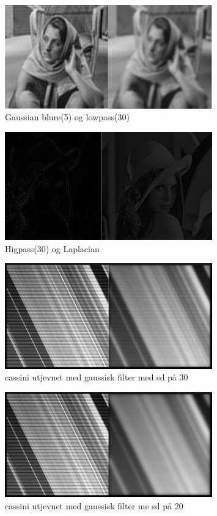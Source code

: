 \documentclass[a4paper, 12pt]{article}
\begin{document}
\begin{figure}[h]
  \centering
  \includegraphics[width=0.8\textwidth]{images/barbara-gaussian-lowpass.png}
  \caption{Gaussian blure(5) og lowpass(30)}
  \label{fig:bgl}
\end{figure}


\begin{figure}[h]
  \centering
  \includegraphics[width=0.8\textwidth]{images/lena-highpass-laplacian.png}
  \caption{Higpass(30) og Laplacian}
  \label{fig:lhl}
\end{figure}


\begin{figure}[h]
  \centering
  \includegraphics[width=0.8\textwidth]{images/cassini-blurred-30.png}
  \caption{cassini utjevnet med gaussisk filter med sd på 30}
  \label{fig:cassini}
\end{figure}


\begin{figure}[h]
  \centering
  \includegraphics[width=0.8\textwidth]{images/cassini-blurred-20.png}
  \caption{cassini utjevnet med gaussisk filter me sd på 20}
  \label{fig:cassini-20}
\end{figure}
\end{document}
